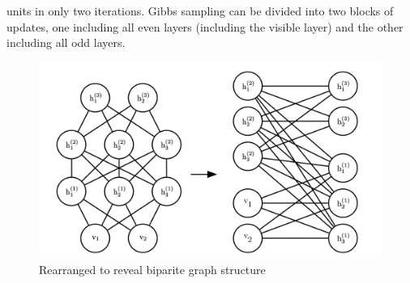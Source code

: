 \documentclass[letterpaper,10pt,english]{article}
\begin{document}
units in only two iterations. Gibbs sampling can be divided into two blocks of
updates, one including all even layers (including the visible layer) and the other
including all odd layers. 
\begin{figure}
	\centering
	\includegraphics[scale = 0.2]{dbm.png}
	\caption{Rearranged to reveal biparite graph structure}
\end{figure}
\end{document}
